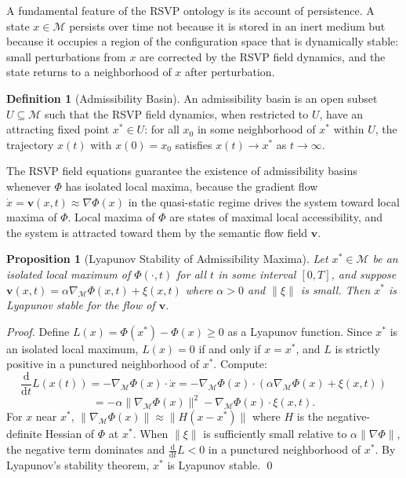 \documentclass[12pt, a4paper, openany]{book}
\theoremstyle{plain}
\newtheorem{proposition}[theorem]{Proposition}
\theoremstyle{definition}
\newtheorem{definition}[theorem]{Definition}
\theoremstyle{remark}
\newcommand{\vvec}{\mathbf{v}}
\begin{document}
A fundamental feature of the RSVP ontology is its account of persistence. A state $x \in \mathcal{M}$ persists over time not because it is stored in an inert medium but because it occupies a region of the configuration space that is dynamically stable: small perturbations from $x$ are corrected by the RSVP field dynamics, and the state returns to a neighborhood of $x$ after perturbation.

\begin{definition}[Admissibility Basin]
An admissibility basin is an open subset $U \subseteq \mathcal{M}$ such that the RSVP field dynamics, when restricted to $U$, have an attracting fixed point $x^* \in U$: for all $x_0$ in some neighborhood of $x^*$ within $U$, the trajectory $x(t)$ with $x(0) = x_0$ satisfies $x(t) \to x^*$ as $t \to \infty$.
\end{definition}

The RSVP field equations guarantee the existence of admissibility basins whenever $\Phi$ has isolated local maxima, because the gradient flow $\dot{x} = \vvec(x,t) \approx \nabla \Phi(x)$ in the quasi-static regime drives the system toward local maxima of $\Phi$. Local maxima of $\Phi$ are states of maximal local accessibility, and the system is attracted toward them by the semantic flow field $\vvec$.

\begin{proposition}[Lyapunov Stability of Admissibility Maxima]
Let $x^* \in \mathcal{M}$ be an isolated local maximum of $\Phi(\cdot, t)$ for all $t$ in some interval $[0,T]$, and suppose $\vvec(x,t) = \alpha \nabla_{\mathcal{M}} \Phi(x,t) + \xi(x,t)$ where $\alpha > 0$ and $\|\xi\|$ is small. Then $x^*$ is Lyapunov stable for the flow of $\vvec$.
\end{proposition}

\begin{proof}
Define $L(x) = \Phi(x^*) - \Phi(x) \geq 0$ as a Lyapunov function. Since $x^*$ is an isolated local maximum, $L(x) = 0$ if and only if $x = x^*$, and $L$ is strictly positive in a punctured neighborhood of $x^*$. Compute:
\[
\frac{\mathrm{d}}{\mathrm{d}t} L(x(t)) = -\nabla_{\mathcal{M}} \Phi(x) \cdot \dot{x} = -\nabla_{\mathcal{M}} \Phi(x) \cdot (\alpha \nabla_{\mathcal{M}} \Phi(x) + \xi(x,t))
\]
\[
= -\alpha \|\nabla_{\mathcal{M}} \Phi(x)\|^2 - \nabla_{\mathcal{M}} \Phi(x) \cdot \xi(x,t).
\]
For $x$ near $x^*$, $\|\nabla_{\mathcal{M}} \Phi(x)\| \approx \|H(x - x^*)\|$ where $H$ is the negative-definite Hessian of $\Phi$ at $x^*$. When $\|\xi\|$ is sufficiently small relative to $\alpha \|\nabla \Phi\|$, the negative term dominates and $\frac{\mathrm{d}}{\mathrm{d}t} L < 0$ in a punctured neighborhood of $x^*$. By Lyapunov's stability theorem, $x^*$ is Lyapunov stable. \qed
\end{proof}
\end{document}
